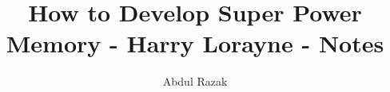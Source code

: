 \documentclass[a4paper,12pt]{book}
\begin{document}
    \author{Abdul Razak}
    \title{How to Develop Super Power Memory - Harry Lorayne - Notes}

    \maketitle
    \tableofcontents
    \mainmatter

%    
%    
    
\end{document}
